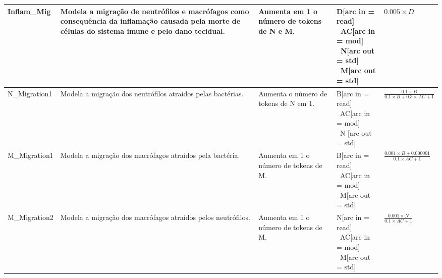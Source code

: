\begin{center}
\begin{longtable}{
				>{\centering\arraybackslash}m{2cm}|
				m{4.23cm}|
				>{\centering\arraybackslash}m{3cm}|
				m{3cm}|
				>{\centering\arraybackslash}m{2.5cm}
			}
			
			Inflam\_Mig & 
			Modela a migração de neutrófilos e macrófagos como consequência da inflamação causada pela morte de células do sistema imune e pelo dano tecidual.  & 
			Aumenta em 1 o número de tokens de N e M. & 
			\parbox{3cm}{D[arc in = read]\\\ AC[arc in = mod]\\\ N[arc out = std]\\\ M[arc out = std]} & 
			$0.005 \times D$ \\\hline
			
			N\_Migration1 & 
			Modela a migração dos neutrófilos atraídos pelas bactérias. 			
			& 
			Aumenta o número de tokens de N em 1.  & 
			\parbox{3cm}{B[arc in = read]\\\ AC[arc in = mod] \\\ N [arc out = std] } & 
			$\frac{0.1 \times B}{0.1 \times B + 0.3 \times AC + 1}$ \\ \hline
						
			
			M\_Migration1 & 
			Modela a migração dos macrófagos atraídos pela bactéria. & 
			Aumenta em 1 o número de tokens de M. & 
			\parbox{3cm}{B[arc in = read]\\\ AC[arc in = mod]\\\ M[arc out = std]} & 
			$\frac{0.001 \times B + 0.000001}{0.1 \times AC + 1}$ \\\hline
			
			M\_Migration2 & 
			Modela a migração dos macrófagos atraídos pelos neutrófilos. & 
			Aumenta em 1 o número de tokens de M. & 
			\parbox{3cm}{N[arc in = read]\\\ AC[arc in = mod]\\\ M[arc out = std]} & 
			$\frac{0.001 \times N}{0.1 \times AC + 1}$ \\\hline
			

\end{longtable}
\end{center}
